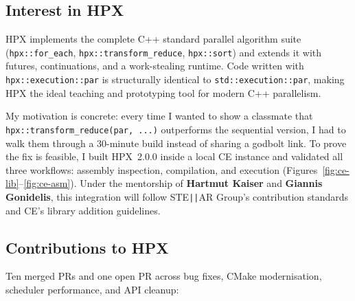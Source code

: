 \documentclass[11pt, a4paper]{article}
\newcommand{\code}[1]{\texttt{#1}}
\begin{document}
\subsection*{Interest in HPX}

HPX implements the complete C++ standard parallel algorithm suite
(\code{hpx::for\_each}, \code{hpx::transform\_reduce}, \code{hpx::sort})
and extends it with futures, continuations, and a work-stealing runtime.
Code written with \code{hpx::execution::par} is structurally identical to
\code{std::execution::par}, making HPX the ideal teaching and prototyping tool
for modern C++ parallelism.

My motivation is concrete: every time I wanted to show a classmate that
\code{hpx::transform\_reduce(par, ...)} outperforms the sequential version,
I had to walk them through a 30-minute build instead of sharing a godbolt link.
To prove the fix is feasible, I built HPX~2.0.0 inside a local CE instance
and validated all three workflows: assembly inspection, compilation, and
execution (Figures~\ref{fig:ce-lib}--\ref{fig:ce-asm}).
Under the mentorship of \textbf{Hartmut Kaiser} and \textbf{Giannis
Gonidelis}, this integration will follow STE\texttt{||}AR Group's
contribution standards and CE's library addition guidelines.

\subsection*{Contributions to HPX}

Ten merged PRs and one open PR across bug fixes, CMake modernisation,
scheduler performance, and API cleanup:
\end{document}
